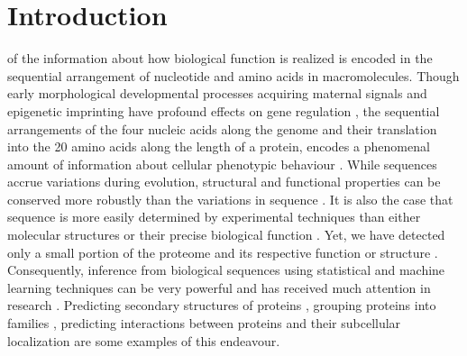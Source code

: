 \documentclass[10pt,journal,compsoc,twoside]{IEEEtran}
\begin{document}
\IEEEpeerreviewmaketitle


\ifCLASSOPTIONcompsoc
{}
\else
\section{Introduction}
\label{sec:introduction}
\fi


% 
% 
% 
 of the information about how biological function is realized is encoded in the sequential arrangement of nucleotide and amino acids in macromolecules. Though early morphological developmental processes acquiring maternal signals and epigenetic imprinting have profound effects on gene regulation \cite{genomic_imprinting_parental_influence}, the sequential arrangements of the four nucleic acids along the genome and their translation into the 20 amino acids along the length of a protein, encodes a phenomenal amount of information about cellular phenotypic behaviour \cite{durbin}. While sequences accrue variations during evolution, structural and functional properties can be conserved more robustly than the variations in sequence \cite{variation_prot}. It is also the case that sequence is more easily determined by experimental techniques than either molecular structures or their precise biological function \cite{lee_redfern_orengo_2007}. Yet, we have detected only a small portion of the proteome and its respective function or structure \cite{dark-proteome1,dark_proteome2}. Consequently, inference from biological sequences using statistical and machine learning techniques can be very powerful and has received much attention in research \cite{durbin,pellegrini_2016}. Predicting secondary structures of proteins \cite{jpred4,Ni}, grouping proteins into families \cite{dani,pfam}, predicting interactions between proteins \cite{prot-interaction} and their subcellular localization \cite{prot-Subcellular,psortb} are some examples of this endeavour. 
\end{document}
